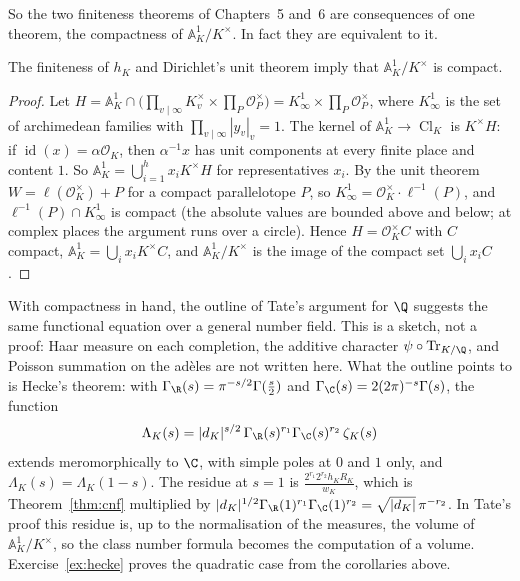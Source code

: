 So the two finiteness theorems of Chapters~5 and~6 are consequences of one theorem, the compactness of $\mathbb{A}_K^1/K^\times$. In fact they are
equivalent to it.

\begin{proposition}\label{prop:fujisakiconverse}
The finiteness of $h_K$ and Dirichlet's unit theorem imply that $\mathbb{A}_K^1/K^\times$ is compact.
\end{proposition}
\begin{proof}
Let $H=\mathbb{A}_K^1\cap\bigl(\prod_{v\mid\infty}K_v^\times\times\prod_P\mathcal O_P^\times\bigr)=K_\infty^1\times\prod_P\mathcal O_P^\times$, where $K_\infty^1$ is the set of
archimedean families with $\prod_{v\mid\infty}|y_v|_v=1$. The kernel of $\mathbb{A}_K^1\to\operatorname{Cl}_K$ is $K^\times H$: if $\operatorname{id}(x)=\alpha\mathcal O_K$, then
$\alpha^{-1}x$ has unit components at every finite place and content $1$. So $\mathbb{A}_K^1=\bigcup_{i=1}^{h}x_iK^\times H$ for representatives $x_i$. By the unit
theorem $W=\ell(\mathcal O_K^\times)+P$ for a compact parallelotope $P$, so $K_\infty^1=\mathcal O_K^\times\cdot\ell^{-1}(P)$, and $\ell^{-1}(P)\cap K_\infty^1$ is
compact (the absolute values are bounded above and below; at complex places the argument runs over a circle). Hence $H=\mathcal O_K^\times C$ with $C$ compact,
$\mathbb{A}_K^1=\bigcup_ix_iK^\times C$, and $\mathbb{A}_K^1/K^\times$ is the image of the compact set $\bigcup_ix_iC$.
\end{proof}

\begin{remark}
With compactness in hand, the outline of Tate's argument for $\Q$ suggests the same functional equation over a general number field. This is a sketch, not a proof: Haar measure on each completion, the additive character $\psi\circ\operatorname{Tr}_{K/\Q}$, and Poisson summation on the ad\`eles are not written here. What the outline points to is
Hecke's theorem: with $\Gamma_\R(s)=\pi^{-s/2}\Gamma(\frac s2)$ and $\Gamma_\C(s)=2(2\pi)^{-s}\Gamma(s)$, the function
\[
\Lambda_K(s)=|d_K|^{s/2}\,\Gamma_\R(s)^{r_1}\Gamma_\C(s)^{r_2}\,\zeta_K(s)
\]
extends meromorphically to $\C$, with simple poles at $0$ and $1$ only, and $\Lambda_K(s)=\Lambda_K(1-s)$. The residue at $s=1$ is $\frac{2^{r_1}2^{r_2}h_KR_K}{w_K}$,
which is Theorem~\ref{thm:cnf} multiplied by $|d_K|^{1/2}\Gamma_\R(1)^{r_1}\Gamma_\C(1)^{r_2}=\sqrt{|d_K|}\,\pi^{-r_2}$. In Tate's proof this residue is, up to the normalisation of the measures, the volume of
$\mathbb{A}_K^1/K^\times$, so the class number formula becomes the computation of a volume. Exercise~\ref{ex:hecke} proves the quadratic
case from the corollaries above.
\end{remark}

